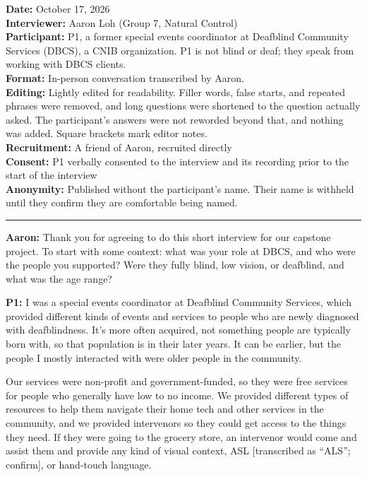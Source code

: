 \textbf{Date:} October 17, 2026\\
\textbf{Interviewer:} Aaron Loh (Group 7, Natural Control)\\
\textbf{Participant:} P1, a former special events coordinator at Deafblind Community Services (DBCS), a CNIB organization. P1 is not blind or deaf; they speak from working with DBCS clients.\\
\textbf{Format:} In-person conversation transcribed by Aaron.\\
\textbf{Editing:} Lightly edited for readability. Filler words, false starts, and repeated phrases were removed, and long questions were shortened to the question actually asked. The participant's answers were not reworded beyond that, and nothing was added. Square brackets mark editor notes.\\
\textbf{Recruitment:} A friend of Aaron, recruited directly\\
\textbf{Consent:} P1 verbally consented to the interview and its recording prior to the start of the interview\\
\textbf{Anonymity:} Published without the participant's name. Their name is withheld until they confirm they are comfortable being named.



\bigskip
\hrule
\bigskip

\textbf{Aaron:} Thank you for agreeing to do this short interview for our capstone project. To start with some context: what was your role at DBCS, and who were the people you supported? Were they fully blind, low vision, or deafblind, and what was the age range?

\textbf{P1:} I was a special events coordinator at Deafblind Community Services, which provided different kinds of events and services to people who are newly diagnosed with deafblindness. It's more often acquired, not something people are typically born with, so that population is in their later years. It can be earlier, but the people I mostly interacted with were older people in the community.

Our services were non-profit and government-funded, so they were free services for people who generally have low to no income. We provided different types of resources to help them navigate their home tech and other services in the community, and we provided intervenors so they could get access to the things they need. If they were going to the grocery store, an intervenor would come and assist them and provide any kind of visual context, ASL [transcribed as ``ALS''; confirm], or hand-touch language.


